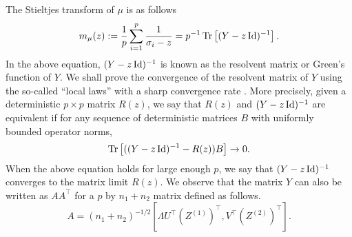 The Stieltjes transform of $\mu$ is as follows
 \[ m_{\mu}(z) := \frac{1}{p}\sum_{i=1}^p \frac{1}{\sigma_i - z}= p^{-1}\operatorname{Tr}\left[(Y-z\operatorname{Id})^{-1}\right]. \]
In the above equation, $(Y - z\operatorname{Id})^{-1}$ is known as the resolvent matrix or Green's function of $Y$.
We shall prove the convergence of the resolvent matrix of $Y$ using the so-called ``local laws'' with a sharp convergence rate \cite{isotropic,erdos2017dynamical,Anisotropic}.
More precisely, given a deterministic $p\times p$ matrix $R(z)$, we say that $R(z)$ and $(Y-z\operatorname{Id})^{-1}$ are equivalent if for any sequence of deterministic matrices $B$ with uniformly bounded operator norms,
$$\operatorname{Tr}\left[((Y-z\operatorname{Id})^{-1}-R(z))B\right]\to 0.$$
When the above equation holds for large enough $p$, we say that $(Y-z\operatorname{Id})^{-1}$ converges to the matrix limit $R(z)$.
We observe that the matrix $Y$ can also be written as $A A^{\top}$ for a $p$ by $n_1 + n_2$ matrix defined as follows.
	\[ A = (n_1+ n_2)^{-1/2} [\Lambda U^\top (Z^{(1)})^\top,V^\top (Z^{(2)})^\top]. \]
